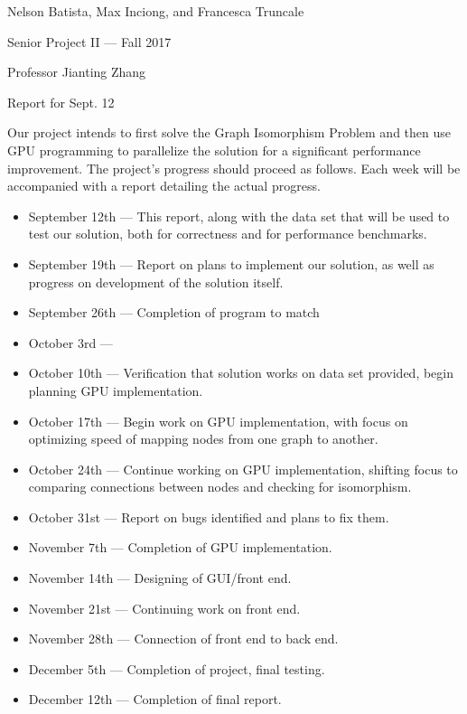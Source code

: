 \documentclass{article}
\begin{document}
\noindent Nelson Batista, Max Inciong, and Francesca Truncale

\noindent Senior Project II --- Fall 2017

\noindent Professor Jianting Zhang

\noindent Report for Sept. 12

Our project intends to first solve the Graph Isomorphism Problem and then use GPU programming to parallelize the solution for a significant performance improvement. The project's progress should proceed as follows. Each week will be accompanied with a report detailing the actual progress.

\begin{itemize}
  \item September 12th --- This report, along with the data set that will be used to test our solution, both for correctness and for performance benchmarks.
  \item September 19th --- Report on plans to implement our solution, as well as progress on development of the solution itself.
  \item September 26th --- Completion of program to match %
  \item October 3rd --- %
  \item October 10th --- Verification that solution works on data set provided, begin planning GPU implementation.
  \item October 17th --- Begin work on GPU implementation, with focus on optimizing speed of mapping nodes from one graph to another.
  \item October 24th --- Continue working on GPU implementation, shifting focus to comparing connections between nodes and checking for isomorphism.
  \item October 31st --- Report on bugs identified and plans to fix them.
  \item November 7th --- Completion of GPU implementation. 
  \item November 14th --- Designing of GUI/front end.
  \item November 21st --- Continuing work on front end.
  \item November 28th --- Connection of front end to back end.
  \item December 5th --- Completion of project, final testing.
  \item December 12th --- Completion of final report.
\end{itemize}
\end{document}
